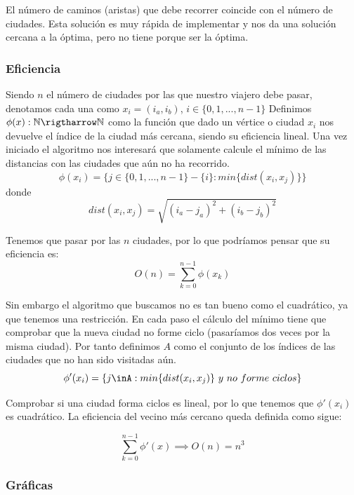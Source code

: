 El número de caminos (aristas) que debe recorrer coincide con el número de ciudades.
Esta solución es muy rápida de implementar y nos da una solución cercana a la óptima, pero no tiene porque ser la óptima.

\subsubsection{Eficiencia}
Siendo $n$ el número de ciudades por las que nuestro viajero debe pasar, denotamos cada una como $x_i=(i_a, i_b)$, $i\in\{0,1,...,n-1\}$
Definimos $\phi (x):\mathbb{N} \rigtharrow \mathbb{N}$ como la función que dado un vértice o ciudad $x_i$ nos devuelve el 
índice de la ciudad más cercana, siendo su eficiencia lineal. Una vez iniciado el algoritmo nos interesará que solamente calcule
el mínimo de las distancias con las ciudades que aún no ha recorrido.
\[\phi(x_i) = \{j \in\{0,1,...,n-1\}-\{i\} : min\{dist(x_i, x_j)\} \}\]
donde 
\[ dist(x_i, x_j) = \sqrt{(i_a-j_a)^2+(i_b-j_b)^2} \]

Tenemos que pasar por las $n$ ciudades, por lo que podríamos pensar que su eficiencia es:
\[O(n) = \sum_{k=0}^{n-1} \phi(x_k)  \]

Sin embargo el algoritmo que buscamos no es tan bueno como el cuadrático, ya que tenemos una restricción. En cada paso el cálculo
del mínimo tiene que comprobar que la nueva ciudad no forme ciclo (pasaríamos dos veces por la misma ciudad).
Por tanto definimos $A$ como el conjunto de los índices de las ciudades que no han sido visitadas aún.
\[\phi '(x_i) = \{j \inA : min\{dist(x_i, x_j)\} \ y \ no \ forme \ ciclos \}\]

Comprobar si una ciudad forma ciclos es lineal, por lo que tenemos que $\phi '(x_i)$ es cuadrático.
La eficiencia del vecino más cercano queda definida como sigue:

\[ \sum_{k=0}^{n-1}\phi ' (x) \implies O(n) = n^3\]

\subsubsection{Gráficas}
